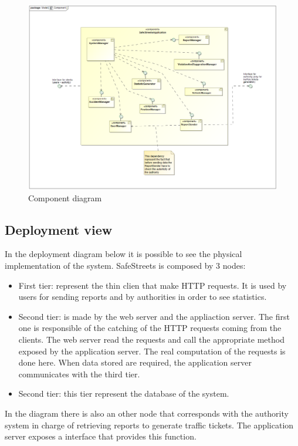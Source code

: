 \begin{figure}[H]
	\centering
	\includegraphics[width=1.12\linewidth]{Images/component.png}
	\caption{Component diagram}
\end{figure}

\subsection{Deployment view}
In the deployment diagram below it is possible to see the physical implementation of the system.
SafeStreets is composed by 3 nodes:
\begin{itemize}
	\item 
	First tier: represent the thin clien that make HTTP requests. It is used by users for sending reports and by authorities in order to see statistics.
	\item 
	Second tier: is made by the web server and the appliaction server. The first one is responsible of the catching of the HTTP requests coming from the clients. The web server read the requests and call the appropriate method exposed by the application server. The real computation of the requests is done here.
	When data stored are required, the application server communicates with the third tier.
	\item 
	Second tier: this tier represent the database of the system. 
\end{itemize} 

In the diagram there is also an other node that corresponds with the authority system in charge of retrieving reports to generate traffic tickets. The application server exposes a interface that provides this function. 

